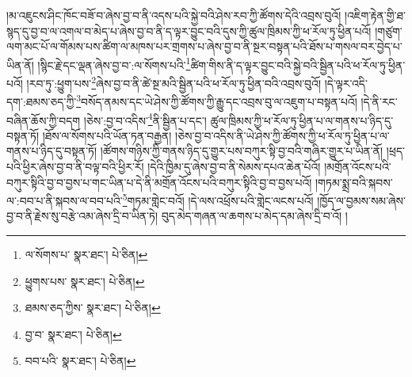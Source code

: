 །མ་འཇུངས་ཤིང་ཁོང་བཟོ་བ་ཞེས་བྱ་བ་ནི་འདས་པའི་སྐྱེ་བའི་ཤེས་རབ་ཀྱི་ཚོགས་དེའི་འབྲས་བུའོ། །འཇིག་རྟེན་གྱི་ཐ་སྙད་དུ་བྱ་བ་ལ་འགལ་བ་མེད་པ་ཞེས་བྱ་བ་ནི་ད་ལྟར་བྱུང་བའི་དུས་ཀྱི་ཚུལ་ཁྲིམས་ཀྱི་ཕ་རོལ་ཏུ་ཕྱིན་པའོ། །གཙུག་ལག་མང་པོ་ལ་གོམས་པས་ཚིག་ལ་མཁས་པར་གྲགས་པ་ཞེས་བྱ་བ་ནི་སྔར་བསྟན་པའི་ཐོས་པ་གསལ་བར་བྱེད་པ་ཡིན་ནོ། །སྙིང་རྗེ་དང་ལྡན་ཞེས་བྱ་བ་:ལ་སོགས་པའི་\footnote{ལ་སོགས་པ་  སྣར་ཐང་།  པེ་ཅིན། }ཚིག་གིས་ནི་ད་ལྟར་བྱུང་བའི་སྐྱེ་བའི་སྦྱིན་པའི་ཕ་རོལ་ཏུ་ཕྱིན་པའོ། །རབ་ཏུ་:ཕྱུག་པས་\footnote{ཕྱུགས་པས་  སྣར་ཐང་།  པེ་ཅིན། }ཞེས་བྱ་བ་ནི་ཚེ་སྔ་མའི་སྦྱིན་པའི་ཕ་རོལ་ཏུ་ཕྱིན་བའི་འབྲས་བུའོ། །དེ་ལྟར་འདི་དག་:ཐམས་ཅད་ཀྱི་\footnote{ཐམས་ཅད་ཀྱིས་  སྣར་ཐང་།  པེ་ཅིན། }བསོད་ནམས་དང་ཡེ་ཤེས་ཀྱི་ཚོགས་ཀྱི་རྒྱུ་དང་འབྲས་བུ་ལ་འཇུག་པ་བསྟན་པའོ། །དེ་ནི་རང་བཞིན་ཆོས་ཀྱི་བདག །ཅེས་:བྱ་བ་འདིས་\footnote{བྱ་བ་  སྣར་ཐང་།  པེ་ཅིན། }ནི་སྦྱིན་པ་དང་། ཚུལ་ཁྲིམས་ཀྱི་ཕ་རོལ་ཏུ་ཕྱིན་པ་ལ་གནས་པ་ཉིད་དུ་བསྟན་ཏོ། །ཐོས་ལ་སོགས་པའི་ཡོན་ཏན་བརྒྱན། །ཅེས་བྱ་བ་འདིས་ནི་ཡེ་ཤེས་ཀྱི་ཚོགས་ཀྱི་ཕ་རོལ་ཏུ་ཕྱིན་པ་ལ་གནས་པ་ཉིད་དུ་བསྟན་ཏོ། །ཚོགས་གཉིས་ཀྱི་གནས་ཉིད་དུ་གྱུར་པས་བཀུར་སྟི་བྱ་བའི་གཞིར་གྱུར་པ་ཡིན་ནོ། །ཕྲད་པའི་ཕྱིར་ཞེས་བྱ་བ་ནི་བལྟ་བའི་ཕྱིར་རོ། །དེའི་ཁྱིམ་དུ་ཞེས་བྱ་བ་ནི་སེམས་དཔའ་ཆེན་པོའོ། །མགྲོན་འོངས་པའི་བཀུར་སྟིའི་བྱ་བ་བྱས་པ་གང་ཡིན་པ་དེ་ནི་མགྲོན་འོངས་པའི་བཀུར་སྟིའི་བྱ་བ་བྱས་པའོ། །གཏམ་སྨྲ་བའི་སྐབས་ལ་:བབ་པ་ནི་སྐབས་ལ་བབ་པའི་\footnote{བབ་པའི་  སྣར་ཐང་།  པེ་ཅིན། }གཏམ་གླེང་བའོ། །དེ་ལས་འཕྲོས་པའི་གླེང་ལངས་པའོ། །ཁྱོད་ལ་བྱམས་སམ་ཞེས་བྱ་བ་ནི་རྗེས་སུ་བརྩེ་འམ་ཞེས་དྲི་བ་ཡིན་ཏེ། བུད་མེད་གཞན་ལ་ཆགས་པ་མེད་དམ་ཞེས་དྲི་བ་འོ། །
